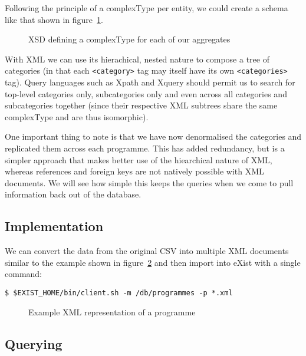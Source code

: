 \documentclass[11pt,a4paper]{article}
\begin{document}
Following the principle of a complexType per entity, we could create
a schema like that shown in figure~\ref{fig:xsd}.

\begin{figure}[p]
  
  \caption{XSD defining a complexType for each of our aggregates}
  \label{fig:xsd}
\end{figure}

With XML we can use its hierachical, nested nature to compose
a tree of categories (in that each \lstinline|<category>| tag may
itself have its own \lstinline|<categories>| tag). Query languages such
as Xpath and Xquery should permit us to search for top-level categories
only, subcategories only and even across all categories and subcategories
together (since their respective XML subtrees share the same complexType and
are thus isomorphic).

One important thing to note is that we have now denormalised the
categories and replicated them across each programme. This has
added redundancy, but is a simpler approach that makes better
use of the hiearchical nature of XML, whereas references and foreign
keys are not natively possible with XML documents. We will see how
simple this keeps the queries when we come to pull information back
out of the database.

\subsection{Implementation}

We can convert the data from the original CSV into multiple XML documents
similar to the example shown in figure~\ref{fig:xml-example} and then import
into eXist with a single command:

\begin{lstlisting}
$ $EXIST_HOME/bin/client.sh -m /db/programmes -p *.xml
\end{lstlisting}

\begin{figure}[p]
  
  \caption{Example XML representation of a programme}
  \label{fig:xml-example}
\end{figure}

\subsection{Querying}
\end{document}

